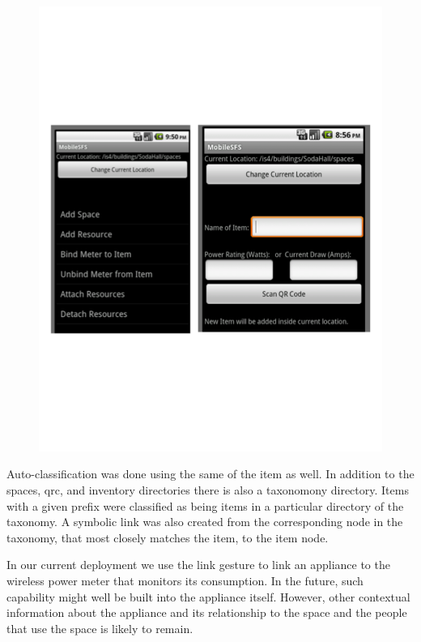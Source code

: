 \begin{figure}[htb!]
\begin{center}
\includegraphics[scale=0.39]{figs/msfsv2screens}
\caption{}
\label{fig:msfsv2}
\end{center}
\end{figure}

Auto-classification was done using the same of the item as well.  In addition to the spaces, qrc, and inventory directories
there is also a taxonomony directory.  Items with a given prefix were classified as being items in a particular
directory of the taxonomy.  A symbolic link was also created from the corresponding node in the taxonomy, that most closely
matches the item, to the item node.

In our current deployment we use the link gesture to link an appliance
to the wireless power meter that monitors its consumption.  In the
future, such capability might well be built into the appliance
itself.  However, other contextual information about the appliance and
its relationship to the space and the people that use the space is
likely to remain.

